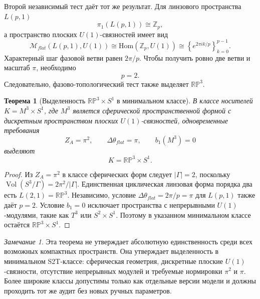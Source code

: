 \documentclass[12pt,a4paper]{report}
\newtheorem{theorem}{Теорема}[chapter]
\theoremstyle{remark}
\newtheorem{remark}{Замечание}[chapter]
\DeclareMathOperator{\Vol}{Vol}
\begin{document}
Второй независимый тест даёт тот же результат. Для линзового пространства \(L(p,1)\)
\begin{equation}
    \pi_1(L(p,1))\cong \mathbb{Z}_p,
\end{equation}
а пространство плоских \(U(1)\)-связностей имеет вид
\begin{equation}
    \mathcal{M}_{flat}(L(p,1),U(1))
    \cong \mathrm{Hom}(\mathbb{Z}_p,U(1))
    \cong \left\{e^{2\pi i k/p}\right\}_{k=0}^{p-1}.
\end{equation}
Характерный шаг фазовой ветви равен \(2\pi/p\). Чтобы получить ровно две ветви и масштаб \(\pi\), необходимо
\begin{equation}
    p=2.
\end{equation}
Следовательно, фазово-топологический тест также выделяет \(\mathbb{RP}^3\).

\begin{theorem}[Выделенность \(\mathbb{RP}^3\times S^1\) в минимальном классе]
В классе носителей \(K=M^3\times S^1\), где \(M^3\) является сферической пространственной формой с дискретным пространством плоских \(U(1)\)-связностей, одновременные требования
\begin{equation}
    Z_A=\pi^2,
    \qquad
    \Delta\theta_{flat}=\pi,
    \qquad
    b_1(M^3)=0
\end{equation}
выделяют
\begin{equation}
    K=\mathbb{RP}^3\times S^1.
\end{equation}
\end{theorem}

\begin{proof}
Из \(Z_A=\pi^2\) в классе сферических форм следует \(|\Gamma|=2\), поскольку \(\Vol(S^3/\Gamma)=2\pi^2/|\Gamma|\). Единственная циклическая линзовая форма порядка два есть \(L(2,1)=\mathbb{RP}^3\). Независимо, условие \(\Delta\theta_{flat}=2\pi/p=\pi\) для \(L(p,1)\) также даёт \(p=2\). Условие \(b_1=0\) исключает пространства с непрерывными \(U(1)\)-модулями, такие как \(T^3\) или \(S^2\times S^1\). Поэтому в указанном минимальном классе остаётся \(\mathbb{RP}^3\times S^1\).
\end{proof}

\begin{remark}
Эта теорема не утверждает абсолютную единственность среди всех возможных компактных пространств. Она утверждает выделенность в минимальном S2T-классе: сферическая геометрия, дискретные плоские \(U(1)\)-связности, отсутствие непрерывных модулей и требуемые нормировки \(\pi^2\) и \(\pi\). Более широкие классы допустимы только как отдельные версии модели и должны проходить тот же аудит без новых ручных параметров.
\end{remark}
\end{document}
